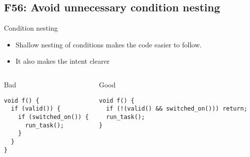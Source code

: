 \subsection{F56: Avoid unnecessary condition nesting}

\begin{frame}[t,fragile]{Condition nesting}
\begin{itemize}
  \item Shallow nesting of conditions makes the code easier to follow.
  \item It also makes the intent clearer
\end{itemize}


\begin{columns}[T]

\begin{block}{Bad}
\begin{lstlisting}
void f() {
  if (valid()) {
    if (switched_on()) {
      run_task();
    }
  }
}
\end{lstlisting}
\end{block}

\pause
\begin{block}{Good}
\begin{lstlisting}
void f() {
  if (!(valid() && switched_on())) return;
  run_task();
}
\end{lstlisting}
\end{block}
\end{columns}
\end{frame}
